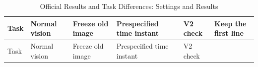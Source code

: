 \FloatBarrier\begingroup\small\setlength{\tabcolsep}{2.5pt}
\begin{longtable}[]{@{}
  >{\raggedright\arraybackslash}p{}
  >{\raggedright\arraybackslash}p{}
  >{\raggedright\arraybackslash}p{}
  >{\raggedright\arraybackslash}p{}
  >{\raggedright\arraybackslash}p{}
  >{\raggedright\arraybackslash}p{}@{}}
\caption{Official Results and Task Differences: Settings and Results}\label{tab:s12-5}\tabularnewline
\toprule\noalign{}
\begin{minipage}[b]{\linewidth}\raggedright
Task
\end{minipage} & \begin{minipage}[b]{\linewidth}\raggedright
Normal vision
\end{minipage} & \begin{minipage}[b]{\linewidth}\raggedright
Freeze old image
\end{minipage} & \begin{minipage}[b]{\linewidth}\raggedright
Prespecified time instant
\end{minipage} & \begin{minipage}[b]{\linewidth}\raggedright
V2 check
\end{minipage} & \begin{minipage}[b]{\linewidth}\raggedright
Keep the first line
\end{minipage} \\
\midrule\noalign{}
\endfirsthead
\toprule\noalign{}
\begin{minipage}[b]{\linewidth}\raggedright
Task
\end{minipage} & \begin{minipage}[b]{\linewidth}\raggedright
Normal vision
\end{minipage} & \begin{minipage}[b]{\linewidth}\raggedright
Freeze old image
\end{minipage} & \begin{minipage}[b]{\linewidth}\raggedright
Prespecified time instant
\end{minipage} & \begin{minipage}[b]{\linewidth}\raggedright
V2 check
\end{minipage} & \begin{minipage}[b]{\linewidth}\raggedright

\end{minipage}
\end{longtable}
